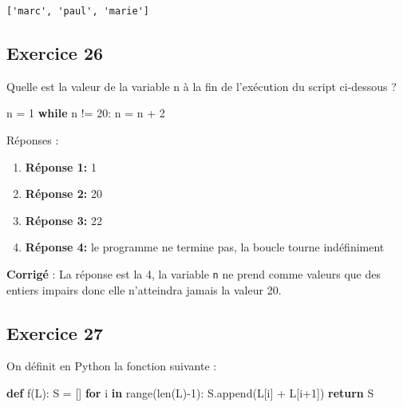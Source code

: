 \documentclass[11pt]{article}
\newenvironment{Shaded}{}{}
\newcommand{\KeywordTok}[1]{\textcolor[rgb]{0.00,0.44,0.13}{\textbf{{#1}}}}
\newcommand{\DecValTok}[1]{\textcolor[rgb]{0.25,0.63,0.44}{{#1}}}
\newcommand{\NormalTok}[1]{{#1}}
\newcommand{\ControlFlowTok}[1]{\textcolor[rgb]{0.00,0.44,0.13}{\textbf{{#1}}}}
\newcommand{\OperatorTok}[1]{\textcolor[rgb]{0.40,0.40,0.40}{{#1}}}
\newcommand{\BuiltInTok}[1]{{#1}}
\begin{document}
    \begin{Verbatim}[commandchars=\\\{\}]
['marc', 'paul', 'marie']

    \end{Verbatim}

    \hypertarget{exercice-26}{%
\subsection{Exercice 26}\label{exercice-26}}

Quelle est la valeur de la variable n à la fin de l'exécution du script
ci-dessous ?

\begin{Shaded}
\begin{Highlighting}[]
\NormalTok{n }\OperatorTok{=} \DecValTok{1}
\ControlFlowTok{while}\NormalTok{ n }\OperatorTok{!=} \DecValTok{20}\NormalTok{:}
\NormalTok{    n }\OperatorTok{=}\NormalTok{ n }\OperatorTok{+} \DecValTok{2}
\end{Highlighting}
\end{Shaded}

Réponses :

\begin{enumerate}
\def\labelenumi{\arabic{enumi}.}
\item
  \textbf{Réponse 1:} 1
\item
  \textbf{Réponse 2:} 20
\item
  \textbf{Réponse 3:} 22
\item
  \textbf{Réponse 4:} le programme ne termine pas, la boucle tourne
  indéfiniment
\end{enumerate}

    \textbf{Corrigé} : La réponse est la 4, la variable \texttt{n} ne prend
comme valeurs que des entiers impairs donc elle n'atteindra jamais la
valeur 20.

    \hypertarget{exercice-27}{%
\subsection{Exercice 27}\label{exercice-27}}

On définit en Python la fonction suivante :

\begin{Shaded}
\begin{Highlighting}[]
\KeywordTok{def}\NormalTok{ f(L):}
\NormalTok{    S }\OperatorTok{=}\NormalTok{ []}
    \ControlFlowTok{for}\NormalTok{ i }\KeywordTok{in} \BuiltInTok{range}\NormalTok{(}\BuiltInTok{len}\NormalTok{(L)}\OperatorTok{{-}}\DecValTok{1}\NormalTok{):}
\NormalTok{        S.append(L[i] }\OperatorTok{+}\NormalTok{ L[i}\OperatorTok{+}\DecValTok{1}\NormalTok{])}
    \ControlFlowTok{return}\NormalTok{ S}
\end{Highlighting}
\end{Shaded}
\end{document}
